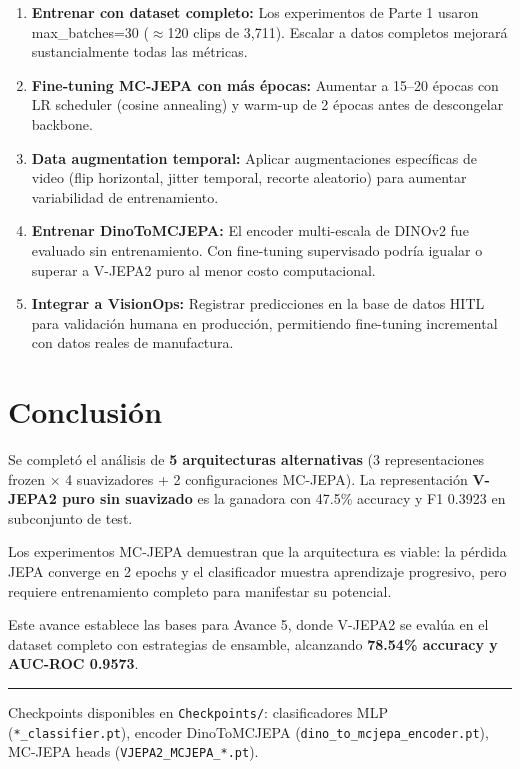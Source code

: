 \documentclass[11pt,letterpaper]{article}
\begin{document}
\begin{enumerate}[leftmargin=1.5em]
  \item \textbf{Entrenar con dataset completo:} Los experimentos de Parte 1 usaron max\_batches=30 ($\approx$120 clips de 3,711). Escalar a datos completos mejorará sustancialmente todas las métricas.

  \item \textbf{Fine-tuning MC-JEPA con más épocas:} Aumentar a 15--20 épocas con LR scheduler (cosine annealing) y warm-up de 2 épocas antes de descongelar backbone.

  \item \textbf{Data augmentation temporal:} Aplicar augmentaciones específicas de video (flip horizontal, jitter temporal, recorte aleatorio) para aumentar variabilidad de entrenamiento.

  \item \textbf{Entrenar DinoToMCJEPA:} El encoder multi-escala de DINOv2 fue evaluado sin entrenamiento. Con fine-tuning supervisado podría igualar o superar a V-JEPA2 puro al menor costo computacional.

  \item \textbf{Integrar a VisionOps:} Registrar predicciones en la base de datos HITL para validación humana en producción, permitiendo fine-tuning incremental con datos reales de manufactura.
\end{enumerate}

\section{Conclusión}

Se completó el análisis de \textbf{5 arquitecturas alternativas} (3 representaciones frozen × 4 suavizadores + 2 configuraciones MC-JEPA). La representación \textbf{V-JEPA2 puro sin suavizado} es la ganadora con 47.5\% accuracy y F1 0.3923 en subconjunto de test.

Los experimentos MC-JEPA demuestran que la arquitectura es viable: la pérdida JEPA converge en 2 epochs y el clasificador muestra aprendizaje progresivo, pero requiere entrenamiento completo para manifestar su potencial.

Este avance establece las bases para Avance 5, donde V-JEPA2 se evalúa en el dataset completo con estrategias de ensamble, alcanzando \textbf{78.54\% accuracy y AUC-ROC 0.9573}.

\vspace{1em}
\hrule
\vspace{0.3em}
{\small Checkpoints disponibles en \texttt{Checkpoints/}: clasificadores MLP (\texttt{*\_classifier.pt}), encoder DinoToMCJEPA (\texttt{dino\_to\_mcjepa\_encoder.pt}), MC-JEPA heads (\texttt{VJEPA2\_MCJEPA\_*.pt}).}
\end{document}
